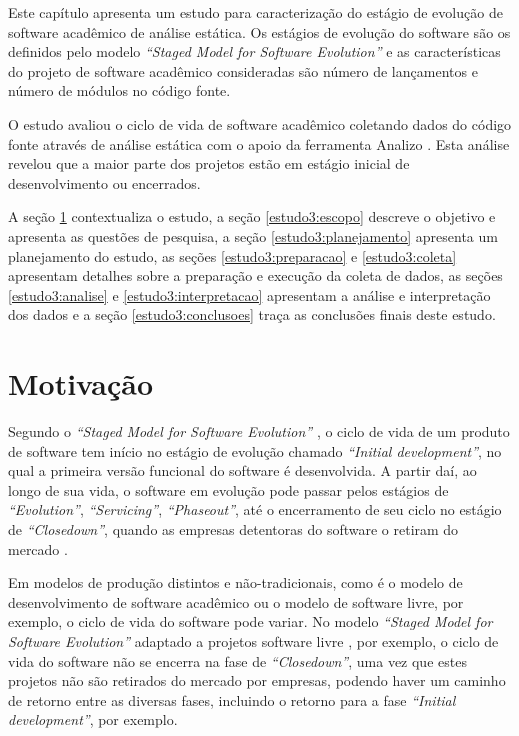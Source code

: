 \label{estudo3}

Este capítulo apresenta
um estudo para caracterização do estágio de evolução de software acadêmico de análise estática.
Os estágios de evolução do software são os definidos pelo modelo 
{\it ``Staged Model for Software Evolution''} \cite{rajlich2000staged}
e as características do projeto de software acadêmico consideradas são 
número de lançamentos e
número de módulos no código fonte.

O estudo avaliou o ciclo de vida de software acadêmico coletando
dados do código fonte através de análise estática com o apoio da
ferramenta Analizo \cite{terceiro2010analizo}.
Esta análise revelou que a maior parte dos projetos
estão em estágio inicial de desenvolvimento ou encerrados.

A seção \ref{estudo3:introducao} contextualiza o estudo,
a seção \ref{estudo3:escopo} descreve o objetivo e apresenta as questões de pesquisa,
a seção \ref{estudo3:planejamento} apresenta um planejamento do estudo,
as seções \ref{estudo3:preparacao} e \ref{estudo3:coleta} apresentam detalhes sobre a preparação e execução da coleta de dados,
as seções \ref{estudo3:analise} e \ref{estudo3:interpretacao} apresentam a análise e interpretação dos dados e
a seção \ref{estudo3:conclusoes} traça as conclusões finais deste estudo.

\section{Motivação} \label{estudo3:introducao} %

Segundo o {\it ``Staged Model for Software Evolution''} \cite{rajlich2000staged},
o ciclo de vida de um produto de software tem início no estágio
de evolução chamado {\it ``Initial development''}, no qual a primeira versão funcional
do software é desenvolvida. A partir daí, ao longo de sua vida,
o software em evolução pode passar pelos estágios de 
{\it``Evolution''}, {\it ``Servicing''}, {\it ``Phaseout''}, até o encerramento de seu ciclo
no estágio de {\it ``Closedown''}, quando as empresas detentoras do
software o retiram do mercado \cite{rajlich2000staged}.

Em modelos de produção distintos e não-tradicionais, como é o modelo de desenvolvimento de
software acadêmico ou o modelo de software livre, por exemplo, o ciclo de vida do software pode
variar. No modelo {\it ``Staged Model for Software Evolution''} adaptado a
projetos software livre \cite{capiluppi2007adapting}, por exemplo, o ciclo de
vida do software não se encerra na fase de {\it ``Closedown''}, uma vez que estes projetos
não são retirados do mercado por empresas, podendo haver um caminho de retorno
entre as diversas fases, incluindo o retorno para a fase {\it
``Initial development''}, por exemplo.

